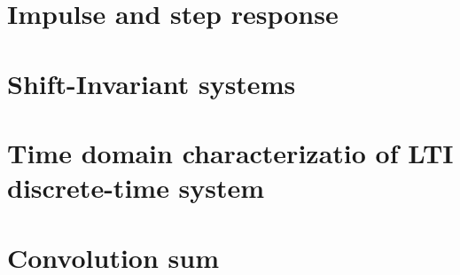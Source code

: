 \documentclass[../../main/main.tex]{subfiles}
\begin{document}

\section{Impulse and step response}





\section{Shift-Invariant systems}





\section{Time domain characterizatio of LTI discrete-time system}





\section{Convolution sum}
\end{document}
